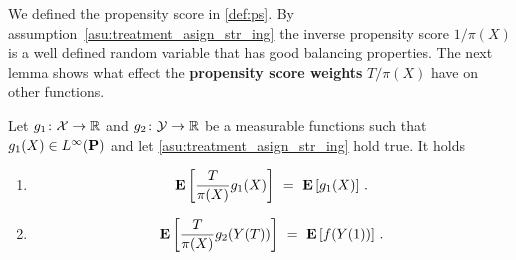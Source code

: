 We defined the propensity score in \eqref{def:ps}.
By assumption~\eqref{asu:treatment_asign_str_ing} 
the inverse propensity score $1/\pi(X)$ is a well defined random variable that has good balancing properties. 
The next lemma shows what effect the 
\textbf{propensity score weights}
$T/\pi(X)$ have on other functions.
\begin{lemma}
  \label{lem:ps_weights}
  \label{ps_weights_lemma}
  Let
  $
  g_1\colon
  \mathcal{X}\to\R
  $
  and
  $
  g_2\colon
  \mathcal{Y}\to\R
  $
  be a measurable functions such that $g_1(X)\in L^\infty(\P)$ and let \eqref{asu:treatment_asign_str_ing} hold true.
  It holds
  \begin{enumerate}[label=(\roman*)]
    \item
  \begin{gather*}
    \E
    \left[
    \frac{T}{\pi(X)}
    g_1(X)
    \right]
    \ 
    =
    \ 
    \E
    \left[
    g_1(X)
    \right]
    \,.
  \end{gather*}
  \item
  \begin{gather*}
    \E
    \left[
    \frac{T}{\pi(X)}
    g_2(Y(T))
    \right]
    \ 
    =
    \ 
    \E
    \left[
    f(Y(1))
    \right]
    \,.
  \end{gather*}
  \end{enumerate}
 \end{lemma}

